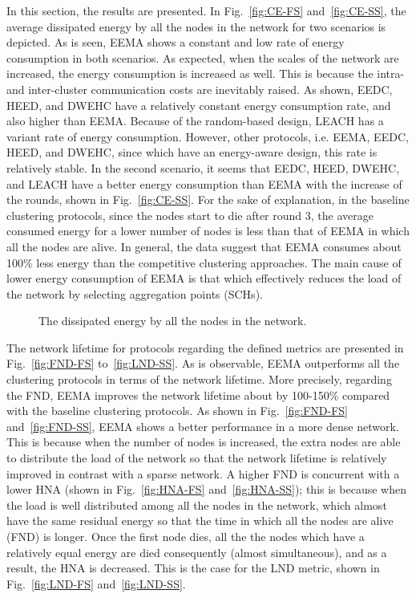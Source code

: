 \documentclass[journal]{IEEEtran}
\begin{document}
In this section, the results are presented. In Fig.~\ref{fig:CE-FS} and~\ref{fig:CE-SS}, the average dissipated energy by all the nodes in the network for two scenarios is depicted.  As is seen, EEMA shows a constant and low rate of energy consumption in both scenarios.  As expected, when the scales of the network are increased, the energy consumption is increased as well.  This is because the intra- and inter-cluster communication costs are inevitably raised.  As shown, EEDC, HEED, and DWEHC have a relatively constant energy consumption rate, and also higher than EEMA.  Because of the random-based design, LEACH has a variant rate of energy consumption.  However, other protocols, i.e. EEMA, EEDC, HEED, and DWEHC, since which have an energy-aware design, this rate is relatively stable.  In the second scenario, it seems that EEDC, HEED, DWEHC, and LEACH have a better energy consumption than EEMA with the increase of the rounds, shown in Fig.~\ref{fig:CE-SS}.  For the sake of explanation, in the baseline clustering protocols, since the nodes start to die after round 3, the average consumed energy for a lower number of nodes is less than that of EEMA in which all the nodes are alive.  In general, the data suggest that EEMA consumes about 100\% less energy than the competitive clustering approaches.  The main cause of lower energy consumption of EEMA is that which effectively reduces the load of the network by selecting aggregation points (SCHs). 
\begin{figure*}[t]
	\centering
	\caption[Optional caption for list of figures]{The dissipated energy by all the nodes in the network.}
	\label{fig:CE}
\end{figure*}
The network lifetime for protocols regarding the defined metrics are presented in Fig.~\ref{fig:FND-FS} to~\ref{fig:LND-SS}.  As is observable, EEMA outperforms all the clustering protocols in terms of the network lifetime.  More precisely, regarding the FND, EEMA improves the network lifetime about by 100-150\% compared with the baseline clustering protocols.  As shown in Fig.~\ref{fig:FND-FS} and~\ref{fig:FND-SS}, EEMA shows a better performance in a more dense network.  This is because when the number of nodes is increased, the extra nodes are able to distribute the load of the network so that the network lifetime is relatively improved in contrast with a sparse network.  A higher FND is concurrent with a lower HNA (shown in Fig.~\ref{fig:HNA-FS} and~\ref{fig:HNA-SS}); this is because when the load is well distributed among all the nodes in the network, which almost have the same residual energy so that the time in which all the nodes are alive (FND) is longer.  Once the first node dies, all the the nodes which have a relatively equal energy are died consequently (almost simultaneous), and as a result, the HNA is decreased.  This is the case for the LND metric, shown in Fig.~\ref{fig:LND-FS} and~\ref{fig:LND-SS}.  
\end{document}
